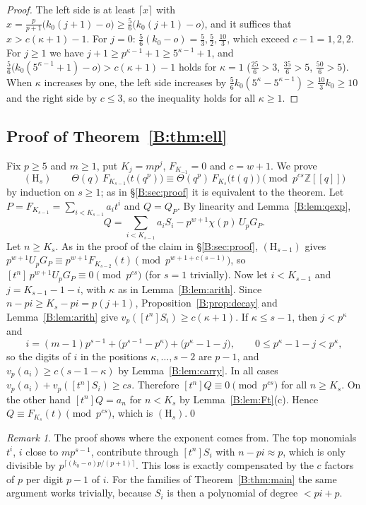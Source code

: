 \documentclass[11pt,a4paper]{article}
\theoremstyle{definition}\newtheorem{definition}[theorem]{Definition}
\theoremstyle{remark}\newtheorem{remark}[theorem]{Remark}
\newcommand{\Z}{\mathbb Z}
\numberwithin{equation}{section}
\begin{document}
\begin{proof}
The left side is at least $\lceil x\rceil$ with $x=\frac{p}{p+1}\bigl(k_0(j+1)-o\bigr)\ge\frac56\bigl(k_0(j+1)-o\bigr)$, and
it suffices that $x>c(\kappa+1)-1$. For $j=0$: $\frac56(k_0-o)=\frac53,\frac52,\frac{10}3$, which exceed $c-1=1,2,2$. For
$j\ge1$ we have $j+1\ge p^{\kappa-1}+1\ge5^{\kappa-1}+1$, and $\frac56\bigl(k_0(5^{\kappa-1}+1)-o\bigr)>c(\kappa+1)-1$ holds for
$\kappa=1$ ($\frac{25}6>3$, $\frac{35}6>5$, $\frac{50}6>5$). When $\kappa$ increases by one, the left side increases by
$\frac56k_0(5^{\kappa}-5^{\kappa-1})\ge\frac{10}3k_0\ge10$ and the right side by $c\le3$, so the inequality holds for all
$\kappa\ge1$.
\end{proof}

\subsection{Proof of Theorem~\ref{B:thm:ell}}
Fix $p\ge5$ and $m\ge1$, put $K_j=mp^j$, $F_{K_{-1}}=0$ and $c=w+1$. We prove
\[
(\mathrm H_s)\qquad \Theta(q)\,F_{K_{s-1}}\bigl(t(q^p)\bigr)\equiv\Theta(q^p)\,F_{K_s}\bigl(t(q)\bigr)\pmod{p^{cs}\Z[[q]]}
\]
by induction on $s\ge1$; as in \S\ref{B:sec:proof} it is equivalent to the theorem. Let $P=F_{K_{s-1}}=\sum_{i<K_{s-1}}a_it^i$
and $Q=Q_P$. By linearity and Lemma~\ref{B:lem:qexp},
\[
Q=\sum_{i<K_{s-1}}a_iS_i-p^{w+1}\chi(p)\,U_pG_P .
\]
Let $n\ge K_s$. As in the proof of the claim in \S\ref{B:sec:proof}, $(\mathrm H_{s-1})$ gives
$p^{w+1}U_pG_P\equiv p^{w+1}F_{K_{s-2}}(t)\pmod{p^{w+1+c(s-1)}}$, so $[t^n]\,p^{w+1}U_pG_P\equiv0\pmod{p^{cs}}$ (for $s=1$
trivially). Now let $i<K_{s-1}$ and $j=K_{s-1}-1-i$, with $\kappa$ as in Lemma~\ref{B:lem:arith}. Since
$n-pi\ge K_s-pi=p(j+1)$, Proposition~\ref{B:prop:decay} and Lemma~\ref{B:lem:arith} give
$v_p([t^n]S_i)\ge c(\kappa+1)$. If $\kappa\le s-1$, then $j<p^\kappa$ and
\[
i=(m-1)p^{s-1}+\bigl(p^{s-1}-p^{\kappa}\bigr)+\bigl(p^\kappa-1-j\bigr),\qquad 0\le p^\kappa-1-j<p^\kappa,
\]
so the digits of $i$ in the positions $\kappa,\dots,s-2$ are $p-1$, and $v_p(a_i)\ge c(s-1-\kappa)$ by
Lemma~\ref{B:lem:carry}. In all cases $v_p(a_i)+v_p([t^n]S_i)\ge cs$. Therefore $[t^n]Q\equiv0\pmod{p^{cs}}$ for all
$n\ge K_s$. On the other hand $[t^n]Q=a_n$ for $n<K_s$ by Lemma~\ref{B:lem:Ft}(c). Hence $Q\equiv F_{K_s}(t)\pmod{p^{cs}}$,
which is $(\mathrm H_s)$.\qed

\begin{remark}
The proof shows where the exponent comes from. The top monomials $t^i$, $i$ close to $mp^{s-1}$, contribute through
$[t^n]S_i$ with $n-pi\approx p$, which is only divisible by $p^{\lceil(k_0-o)p/(p+1)\rceil}$. This loss is exactly
compensated by the $c$ factors of $p$ per digit $p-1$ of $i$. For the families of Theorem~\ref{B:thm:main} the same
argument works trivially, because $S_i$ is then a polynomial of degree $<pi+p$.
\end{remark}
\end{document}
